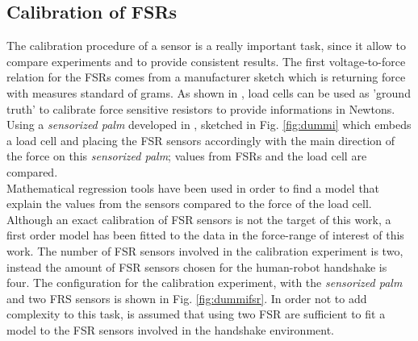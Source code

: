 \subsection{Calibration of FSRs}
The calibration procedure of a sensor is a really important task, since it allow to compare experiments and to provide consistent results. 
The first voltage-to-force relation for the FSRs comes from a manufacturer sketch which is returning force with measures standard of grams.
As shown in \cite{calibFSR}, load cells can be used as 'ground truth' to calibrate force sensitive resistors to provide informations in Newtons. 
Using a \textit{sensorized palm} developed in \cite{espen}, sketched in Fig. \ref{fig:dummi} which embeds a load cell and placing the FSR sensors accordingly with the main direction of the force on this \textit{sensorized palm}; values from FSRs and the load cell are compared.\\
Mathematical regression tools have been used in order to find a model that explain the values from the sensors compared to the force of the load cell.
Although an exact calibration of FSR sensors is not the target of this work, a first order model has been fitted to the data in the force-range of interest of this work.
The number of FSR sensors involved in the calibration experiment is two, instead the amount of FSR sensors chosen for the human-robot handshake is four. 
The configuration for the calibration experiment, with the \textit{sensorized palm} and two FRS sensors is shown in Fig. \ref{fig:dummifsr}. In order not to add complexity to this task, is assumed that using two FSR are sufficient to fit a model to the FSR sensors involved in the handshake environment.\\

